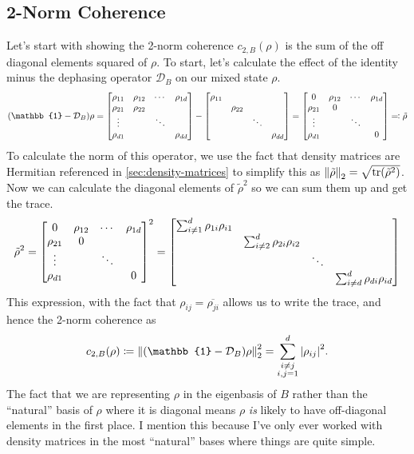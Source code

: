 \documentclass[11pt,english]{article}
\theoremstyle{definition}
\newcommand{\twonorm}[1][\rho]{c_{2,B} (#1)}
\newcommand{\dephase}{\mathcal{D}_B}
\begin{document}
\subsection{2-Norm Coherence}
Let's start with showing the 2-norm coherence $\twonorm{}$ is the sum of the off diagonal elements squared of $\rho$.
To start, let's calculate the effect of the identity minus the dephasing operator $\dephase$ on our mixed state $\rho$.
\begin{equation*}
	\qty(\mathbb{1} - \dephase)\rho = \mqty[\rho_{11} & \rho_{12} & \cdots & \rho_{1d} \\ \rho_{21} & \rho_{22} & & \\ \vdots & & \ddots & \\ \rho_{d1} & & & \rho_{dd}] - \mqty[\diagonalmatrix{\rho_{11},\rho_{22},\ddots,\rho_{dd}}] = \mqty[0 & \rho_{12} & \cdots & \rho_{1d} \\ \rho_{21} & 0 & & \\ \vdots & & \ddots & \\ \rho_{d1} & & & 0] \eqqcolon \tilde{\rho}
\end{equation*}
To calculate the norm of this operator, we use the fact that density matrices are Hermitian referenced in \cref{sec:density-matrices} to simplify this as $\norm{\tilde{\rho}}_2 = \sqrt{\tr(\tilde{\rho}^2)}$.
Now we can calculate the diagonal elements of $\tilde{\rho}^2$ so we can sum them up and get the trace.
\begin{equation*}
	\tilde{\rho}^2 = \mqty[0 & \rho_{12} & \cdots & \rho_{1d} \\ \rho_{21} & 0 & & \\ \vdots & & \ddots & \\ \rho_{d1} & & & 0]^2  = \mqty[\dmat{\sum_{i \neq 1 }^d\rho_{1i}\rho_{i1},\sum_{i \neq 2}^d\rho_{2i}\rho_{i2},\ddots, \sum_{i \neq d}^d\rho_{di}\rho_{id}}]
\end{equation*}
This expression, with the fact that $\rho_{ij} = \overline{\rho_{ji}}$ allows us to write the trace, and hence the 2-norm coherence as
\begin{equation}\label{eq:2norm}
	\twonorm{} \coloneqq\norm{\qty(\mathbb{1} - \dephase)\rho}_2^2 = \sum_{\substack{i\neq j \\ i,j = 1}}^d\abs{\rho_{ij}}^2.
\end{equation}
The fact that we are representing $\rho$ in the eigenbasis of $B$ rather than the ``natural'' basis of $\rho$ where it is diagonal means $\rho$ \emph{is} likely to have off-diagonal elements in the first place. I mention this because I've only ever worked with density matrices in the most ``natural'' bases where things are quite simple.
\end{document}
